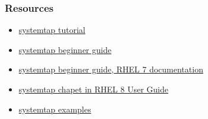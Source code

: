 \documentclass[10pt,utf8]{beamer}
\begin{document}
\begin{frame}
	\frametitle{Resources}
	\begin{itemize}
		\item \color{blue}\href{http://sourceware.org/systemtap/tutorial.pdf}{systemtap tutorial}
		\item \href{https://sourceware.org/systemtap/SystemTap_Beginners_Guide/}{systemtap beginner guide}
		\item \href{https://access.redhat.com/documentation/en-us/red\_hat\_enterprise_linux/7/html-single/systemtap\_beginners\_guide/index}{systemtap beginner guide, RHEL 7 documentation}
		\item \href{https://access.redhat.com/documentation/en-us/red_hat_developer\_toolset/8/html/user\_guide/chap-systemtap}{systemtap chapet in RHEL 8 User Guide}
		\item \href{https://sourceware.org/systemtap/examples/}{systemtap examples}
	\end{itemize}
	
\end{frame}
\end{document}
